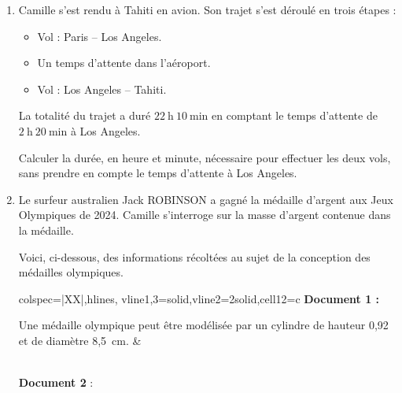 \documentclass[exercice,a4]{thedocument}%
\begin{document}
\begin{enumerate}
\item Camille s'est rendu à Tahiti en avion. Son trajet s'est déroulé en trois étapes :
\begin{itemize}
\item Vol  : Paris – Los Angeles.
\item Un temps d'attente dans l'aéroport.
\item Vol  : Los Angeles – Tahiti.
\end{itemize}
La totalité du trajet a duré $22\ \text{h}\ 10\ \text{min}$ en comptant le temps d'attente de $2\ \text{h}\ 20\ \text{min}$ à Los Angeles.

Calculer la durée, en heure et minute, nécessaire pour effectuer les deux vols, sans prendre en compte le temps d'attente à Los Angeles.

\item Le surfeur australien Jack ROBINSON a gagné la médaille d'argent aux Jeux Olympiques de 2024. Camille s'interroge sur la masse d'argent contenue dans la médaille.

Voici, ci-dessous, des informations récoltées au sujet de la conception des médailles olympiques.

\medskip
\begin{tblr}{colspec={|XX|},hlines, vline{1,3}={solid},vline{2}={2}{solid},cell{1}{2}={c}}
\textbf{Document 1 :}

Une médaille olympique peut être modélisée par un cylindre de hauteur 0{,}92\  et de diamètre 8{,}5\ cm. &
\\
\textbf{Document 2} :


\end{tblr}
\end{enumerate}
\end{document}
